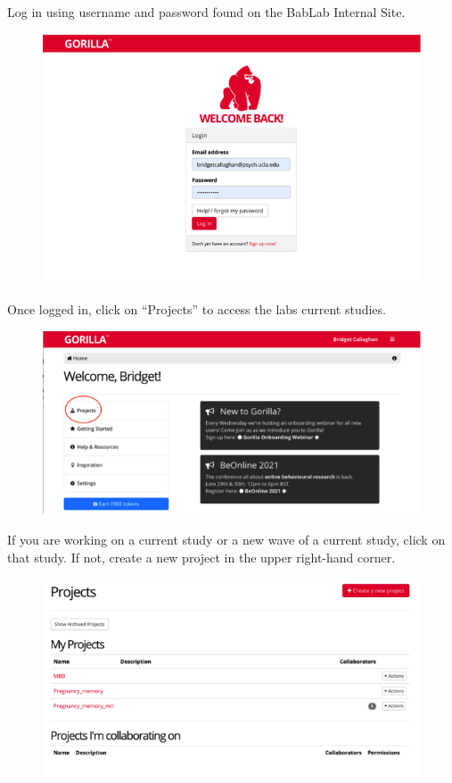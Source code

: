 \documentclass[]{book}
\begin{document}
Log in using username and password found on the BabLab Internal Site.

\begin{figure}
\centering
\includegraphics{images/research_protocols/gorilla/gorilla2.png}
\caption{}
\end{figure}

Once logged in, click on ``Projects'' to access the labs current studies.

\begin{figure}
\centering
\includegraphics{images/research_protocols/gorilla/gorilla3.png}
\caption{}
\end{figure}

If you are working on a current study or a new wave of a current study, click on that study. If not, create a new project in the upper right-hand corner.

\begin{figure}
\centering
\includegraphics{images/research_protocols/gorilla/gorilla4.png}
\caption{}
\end{figure}
\end{document}
